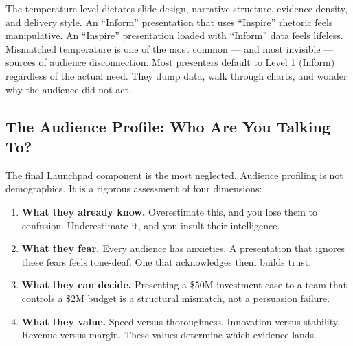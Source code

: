 \begin{keybox}
The temperature level dictates slide design, narrative structure, evidence density, and delivery style. An ``Inform'' presentation that uses ``Inspire'' rhetoric feels manipulative. An ``Inspire'' presentation loaded with ``Inform'' data feels lifeless. Mismatched temperature is one of the most common --- and most invisible --- sources of audience disconnection. Most presenters default to Level 1 (Inform) regardless of the actual need. They dump data, walk through charts, and wonder why the audience did not act.
\end{keybox}

\subsection{The Audience Profile: Who Are You Talking To?}


The final Launchpad component is the most neglected. Audience profiling is not demographics. It is a rigorous assessment of four dimensions:

\begin{enumerate}
  \item \textbf{What they already know.} Overestimate this, and you lose them to confusion. Underestimate it, and you insult their intelligence.
  \item \textbf{What they fear.} Every audience has anxieties. A presentation that ignores these fears feels tone-deaf. One that acknowledges them builds trust.
  \item \textbf{What they can decide.} Presenting a \$50M investment case to a team that controls a \$2M budget is a structural mismatch, not a persuasion failure.
  \item \textbf{What they value.} Speed versus thoroughness. Innovation versus stability. Revenue versus margin. These values determine which evidence lands.
\end{enumerate}

